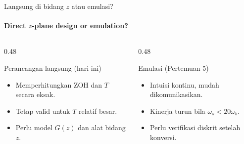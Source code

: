 \documentclass[aspectratio=169,10pt]{beamer}
\begin{document}
\begin{frame}{Langsung di bidang $z$ atau emulasi?}
	\framesubtitle{Direct $z$-plane design or emulation?}
	\begin{columns}[T]
		\begin{column}{0.48\textwidth}
			\begin{block}{Perancangan langsung (hari ini)}
				\small
				\begin{itemize}
					\item Memperhitungkan ZOH dan $T$ secara eksak.
					\item Tetap valid untuk $T$ relatif besar.
					\item Perlu model $G(z)$ dan alat bidang $z$.
				\end{itemize}
			\end{block}
		\end{column}
		\begin{column}{0.48\textwidth}
			\begin{block}{Emulasi (Pertemuan 5)}
				\small
				\begin{itemize}
					\item Intuisi kontinu, mudah dikomunikasikan.
					\item Kinerja turun bila $\omega_s < 20\omega_b$.
					\item Perlu verifikasi diskrit setelah konversi.
				\end{itemize}
			\end{block}
		\end{column}
	\end{columns}
	\vspace{0.2cm}
\end{frame}
\end{document}
